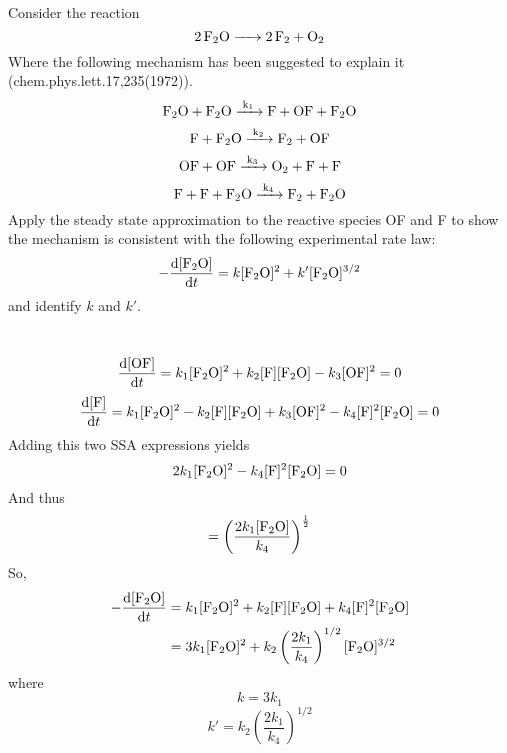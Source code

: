 \item Consider the reaction
\begin{equation*}
    \ce{2F_2O -> 2F_2 +O_2}
\end{equation*}
Where the following mechanism has been suggested to explain it (chem.phys.lett.17,235(1972)).
\begin{equation*}
    \ce{F_2O + F_2O ->[k_1] F + OF + F_2O}
\end{equation*}
\begin{equation*}
    \ce{F + F_2O ->[k_2] F_2 + OF}
\end{equation*}
\begin{equation*}
    \ce{OF + OF ->[k_3] O_2 + F + F}
\end{equation*}
\begin{equation*}
    \ce{F + F + F_2O ->[k_4] F_2 + F_2O}
\end{equation*}
Apply the steady state approximation to the reactive species OF and F to show the
mechanism is consistent with the following experimental rate law:
\begin{equation*}
    -\dd{[\ce{F_2O}]}{t}=k[\ce{F_2O}]^2+k'[\ce{F_2O}]^{3/2}
\end{equation*}
and identify $k$ and $k'$.

\begin{solution}\
    \begin{equation*}
        \dd{[\ce{OF}]}{t}=k_1[\ce{F_2O}]^2+k_2[\ce{F}][\ce{F_2O}]-k_3[\ce{OF}]^2=0
    \end{equation*}
    \begin{equation*}
        \dd{[\ce{F}]}{t}=k_1[\ce{F_2O}]^2-k_2[\ce{F}][\ce{F_2O}]+k_3[\ce{OF}]^2-k_4[\ce{F}]^2[\ce{F_2O}]
        =0
    \end{equation*}
    Adding this two SSA expressions yields
    \begin{equation*}
        2k_1[\ce{F_2O}]^2-k_4[\ce{F}]^2[\ce{F_2O}]=0
    \end{equation*}
    And thus
    \begin{equation*}
        [\ce{F}]=\left(\frac{2k_1[\ce{F_2O}]}{k_4}\right)^{\frac{1}{2}}
    \end{equation*}
    So,
    \begin{equation*}
        \begin{aligned}
            -\dd{[\ce{F_2O}]}{t} & =k_1[\ce{F_2O}]^2+k_2[\ce{F}][\ce{F_2O}]+k_4[\ce{F}]^2[\ce{F_2O}]          \\
                                 & =3k_1[\ce{F_2O}]^2+k_2\left(\frac{2k_1}{k_4}\right)^{1/2}[\ce{F_2O}]^{3/2}
        \end{aligned}
    \end{equation*}
    where
    \begin{equation*}
        k=3k_1
    \end{equation*}
    \begin{equation*}
        k'=k_2\left(\frac{2k_1}{k_4}\right)^{1/2}
    \end{equation*}
\end{solution}